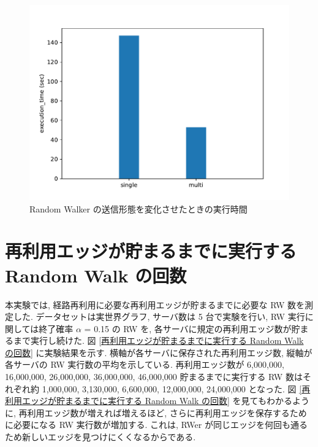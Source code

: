\begin{figure}[t]
    \centering
    \includegraphics[scale=0.8]{figure/AR_send_num.pdf}
    \caption{Random Walker の送信形態を変化させたときの実行時間}
    \label{Random Walker の送信形態を変化させたときの実行時間}
\end{figure}

\section{再利用エッジが貯まるまでに実行する Random Walk の回数}\label{再利用エッジが貯まるまでに実行する Random Walk 実行数}

本実験では, 経路再利用に必要な再利用エッジが貯まるまでに必要な RW 数を測定した. データセットは実世界グラフ, サーバ数は 5 台で実験を行い, RW 実行に関しては終了確率 $\alpha$ = 0.15 の RW を, 各サーバに規定の再利用エッジ数が貯まるまで実行し続けた. 図 \ref{再利用エッジが貯まるまでに実行する Random Walk の回数} に実験結果を示す. 横軸が各サーバに保存された再利用エッジ数, 縦軸が各サーバの RW 実行数の平均を示している. 再利用エッジ数が 6,000,000, 16,000,000, 26,000,000, 36,000,000, 46,000,000 貯まるまでに実行する RW 数はそれぞれ約 1,000,000, 3,130,000, 6,600,000, 12,000,000, 24,000,000 となった. 図 \ref{再利用エッジが貯まるまでに実行する Random Walk の回数} を見てもわかるように, 再利用エッジ数が増えれば増えるほど, さらに再利用エッジを保存するために必要になる RW 実行数が増加する. これは, RWer が同じエッジを何回も通るため新しいエッジを見つけにくくなるからである. 

